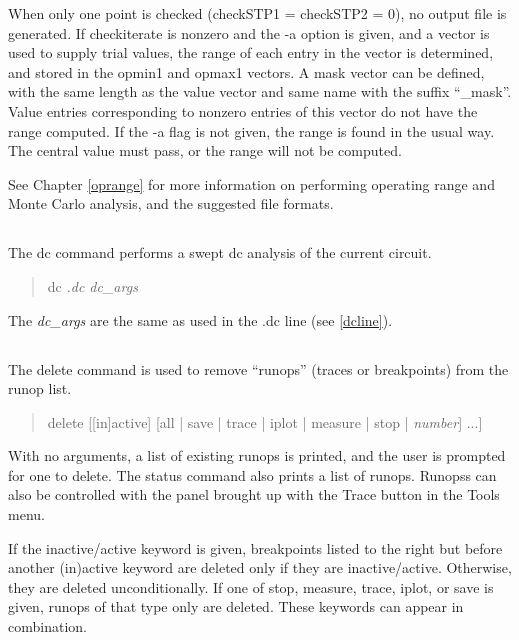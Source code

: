 When only one point is checked ({\vt checkSTP1 = checkSTP2 = 0}), no
output file is generated.  If {\et checkiterate} is nonzero and the
{\vt -a} option is given, and a vector is used to supply trial values,
the range of each entry in the vector is determined, and stored in the
{\et opmin1} and {\et opmax1} vectors.  A mask vector can be defined,
with the same length as the value vector and same name with the suffix
``{\vt \_mask}''.  Value entries corresponding to nonzero entries of
this vector do not have the range computed.  If the {\vt -a} flag is
not given, the range is found in the usual way.  The central value
must pass, or the range will not be computed.

See Chapter \ref{oprange} for more information on performing operating
range and Monte Carlo analysis, and the suggested file formats.

\subsection{}


The {\cb dc} command performs a swept dc analysis of the current
circuit.
\begin{quote}\vt
dc {\it .dc dc\_args}
\end{quote}
The {\it dc\_args} are the same as used in the {\vt .dc} line (see
\ref{dcline}).

\subsection{}


The {\cb delete} command is used to remove ``runops'' (traces or
breakpoints) from the runop list.
\begin{quote}\vt
delete [[in]active] [all | save | trace | iplot | measure | stop |
 {\it number\/}] ...]
\end{quote}
With no arguments, a list of existing runops is printed, and the
user is prompted for one to delete.  The {\cb status} command also
prints a list of runops.  Runopss can also be controlled with the
panel brought up with the {\cb Trace} button in the {\cb Tools}
menu.

If the {\vt inactive}/{\vt active} keyword is given, breakpoints
listed to the right but before another {\vt (in)active} keyword are
deleted only if they are inactive/active.  Otherwise, they are deleted
unconditionally.  If one of {\vt stop}, {\vt measure}, {\vt trace},
{\vt iplot}, or {\vt save} is given, runops of that type only are
deleted.  These keywords can appear in combination.

